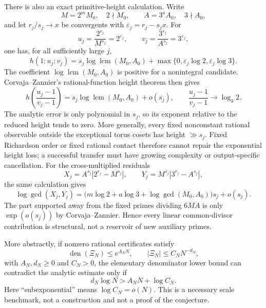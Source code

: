\documentclass[11pt,oneside]{article}
\theoremstyle{definition}
\theoremstyle{remark}
\newcommand{\den}{\operatorname{den}}
\begin{document}
There is also an exact primitive-height calculation.  Write
\[
 M=2^mM_0,\quad 2\nmid M_0,
 \qquad A=3^aA_0,\quad 3\nmid A_0,
\]
and let $r_j/s_j\to x$ be convergents with
$\varepsilon_j=r_j-s_jx$.  For
\[
 u_j=\frac{2^{r_j}}{M^{s_j}}=2^{\varepsilon_j},\qquad
 v_j=\frac{3^{r_j}}{A^{s_j}}=3^{\varepsilon_j},
\]
one has, for all sufficiently large $j$,
\begin{equation}
 h(1:u_j:v_j)
 =s_j\log\operatorname{lcm}(M_0,A_0)
  +\max\{0,\varepsilon_j\log2,\varepsilon_j\log3\}.
 \label{orbitheight:eq-projective-secant-height}
\end{equation}
The coefficient $\log\operatorname{lcm}(M_0,A_0)$ is positive for a nonintegral
candidate.  Corvaja--Zannier's rational-function height theorem
\cite{CorvajaZannier2005} then gives
\begin{equation}
 h\!\left(\frac{u_j-1}{v_j-1}\right)
 =s_j\log\operatorname{lcm}(M_0,A_0)+o(s_j),
 \qquad
 \frac{u_j-1}{v_j-1}\longrightarrow\log_3 2.
 \label{orbitheight:eq-secant-height-zero}
\end{equation}
The analytic error is only polynomial in $s_j$, so its exponent relative to the reduced
height tends to zero.  More generally, every fixed nonconstant rational observable outside
the exceptional torus cosets has height $\gg s_j$.  Fixed Richardson order or fixed rational
contact therefore cannot repair the exponential height loss; a successful transfer must
have growing complexity or output-specific cancellation.
For the cross-multiplied residuals
\[
 X_j=A^{s_j}|2^{r_j}-M^{s_j}|,\qquad
 Y_j=M^{s_j}|3^{r_j}-A^{s_j}|,
\]
the same calculation gives
\begin{equation}
 \log\gcd(X_j,Y_j)
 =\bigl(m\log2+a\log3+\log\gcd(M_0,A_0)\bigr)s_j+o(s_j).
 \label{orbitheight:eq-cross-residual-gcd}
\end{equation}
The part supported away from the fixed primes dividing $6MA$ is only $\exp(o(s_j))$ by
Corvaja--Zannier.  Hence every linear common-divisor contribution is structural, not a
reservoir of new auxiliary primes.

More abstractly, if nonzero rational certificates satisfy
\[
 \den(\Xi_N)\le e^{A_NN},\qquad |\Xi_N|\le C_NN^{-d_N},
\]
with $A_N,d_N\ge0$ and $C_N>0$, the elementary denominator lower bound can contradict the
analytic estimate only if
\begin{equation}
 d_N\log N>A_NN+\log C_N.
 \label{orbitheight:eq-jet-budget}
\end{equation}
Here ``subexponential'' means $\log C_N=o(N)$.  This is a necessary scale benchmark, not a
construction and not a proof of the conjecture.
\end{document}
